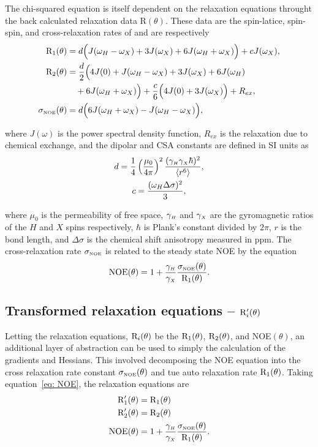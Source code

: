 The chi-squared equation is itself dependent on the relaxation equations throught the back calculated relaxation data R$(\theta)$.  These data are the spin-latice, spin-spin, and cross-relaxation rates of \citet{Abragam61} and are respectively
\begin{align}
 \mathrm{R}_1(\theta) &= d \Big( J(\omega_H - \omega_X) + 3J(\omega_X) + 6J(\omega_H + \omega_X) \Big) + cJ(\omega_X),   \\  \label{eq: R1}
 \mathrm{R}_2(\theta) &= \frac{d}{2} \Big( 4J(0) + J(\omega_H - \omega_X) + 3J(\omega_X) + 6J(\omega_H)                  \nonumber \\
     &  \quad + 6J(\omega_H + \omega_X) \Big) + \frac{c}{6} \Big( 4J(0) + 3J(\omega_X) \Big) + R_{ex},  \\  \label{eq: R2}
 \sigma_{\scriptscriptstyle \mathrm{NOE}}(\theta) &= d \Big( 6J(\omega_H + \omega_X) - J(\omega_H - \omega_X) \Big),                          \\  \label{eq: sigma_NOE}
\end{align}

\noindent where $J(\omega)$ is the power spectral density function, $R_{ex}$ is the relaxation due to chemical exchange, and the dipolar and CSA constants are defined in SI units as
\begin{gather}
 d = \frac{1}{4} \left(\frac{\mu_0}{4\pi}\right)^2 \frac{(\gamma_{\scriptscriptstyle H} \gamma_{\scriptscriptstyle X} \hbar)^2}{\langle r^6 \rangle}, \label{eq: dipolar constant} \\
 c = \frac{(\omega_H \Delta\sigma)^2}{3}, \label{eq: CSA constant}
\end{gather}

\noindent where $\mu_0$ is the permeability of free space, $\gamma_{\scriptscriptstyle H}$ and $\gamma_{\scriptscriptstyle X}$ are the gyromagnetic ratios of the $H$ and $X$ spins respectively, $\hbar$ is Plank's constant divided by $2\pi$, $r$ is the bond length, and $\Delta\sigma$ is the chemical shift anisotropy measured in ppm.  The cross-relaxation rate $\sigma_{\scriptscriptstyle \mathrm{NOE}}$ is related to the steady state NOE by the equation
\begin{equation} \label{eq: NOE}
 \mathrm{NOE}(\theta) = 1 + \frac{\gamma_{\scriptscriptstyle H}}{\gamma_{\scriptscriptstyle X}} \frac{\sigma_{\scriptscriptstyle \mathrm{NOE}}(\theta)}{\mathrm{R}_1(\theta)}.
\end{equation}


\subsection{Transformed relaxation equations -- $\mathrm{R}_i'(\theta)$}

Letting the relaxation equations, $\mathrm{R}_i(\theta)$ be the $\mathrm{R}_1(\theta)$, $\mathrm{R}_2(\theta)$, and NOE$(\theta)$, an additional layer of abstraction can be used to simply the calculation of the gradients and Hessians.  This involved decomposing the NOE equation into the cross relaxation rate constant $\sigma_{\scriptscriptstyle \mathrm{NOE}}(\theta)$ and tue auto relaxation rate $\mathrm{R}_1(\theta)$.  Taking equation~\eqref{eq: NOE}, the relaxation equations are
\begin{align}
 \mathrm{R}_1'(\theta) &= \mathrm{R}_1(\theta) \\
 \mathrm{R}_2'(\theta) &= \mathrm{R}_2(\theta) \\
 \mathrm{NOE}(\theta)  &= 1 + \frac{\gamma_{\scriptscriptstyle H}}{\gamma_{\scriptscriptstyle X}} \frac{\sigma_{\scriptscriptstyle \mathrm{NOE}}(\theta)}{\mathrm{R}_1(\theta)}.
\end{align}

